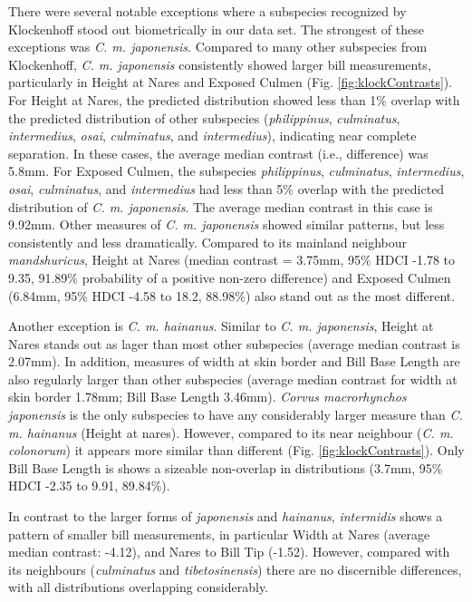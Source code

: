 \documentclass[10pt,a4paper]{article}
\begin{document}
There were several notable exceptions where a subspecies recognized by Klockenhoff stood out biometrically in our data set.
The strongest of these exceptions was \emph{C. m. japonensis}.
Compared to many other subspecies from Klockenhoff, \emph{C. m. japonensis} consistently showed larger bill measurements, particularly in Height at Nares and Exposed Culmen (Fig. \ref{fig:klockContrasts}).
For Height at Nares, the predicted distribution showed less than 1\% overlap with the predicted distribution of other subspecies (\emph{philippinus}, \emph{culminatus}, \emph{intermedius}, \emph{osai}, \emph{culminatus}, and \emph{intermedius}), indicating near complete separation.
In these cases, the average median contrast (i.e., difference) was 5.8mm.
For Exposed Culmen, the subspecies \emph{philippinus}, \emph{culminatus}, \emph{intermedius}, \emph{osai}, \emph{culminatus}, and \emph{intermedius} had less than 5\% overlap with the predicted distribution of \emph{C. m. japonensis}.
The average median contrast in this case is 9.92mm.
Other measures of \emph{C. m. japonensis} showed similar patterns, but less consistently and less dramatically.
Compared to its mainland neighbour \emph{mandshuricus}, Height at Nares (median contrast = 3.75mm, 95\% HDCI -1.78 to 9.35, 91.89\% probability of a positive non-zero difference) and Exposed Culmen (6.84mm, 95\% HDCI -4.58 to 18.2, 88.98\%) also stand out as the most different.

Another exception is \emph{C. m. hainanus}.
Similar to \emph{C. m. japonensis}, Height at Nares stands out as lager than most other subspecies (average median contrast is 2.07mm).
In addition, measures of width at skin border and Bill Base Length are also regularly larger than other subspecies (average median contrast for width at skin border 1.78mm; Bill Base Length 3.46mm).
\emph{Corvus macrorhynchos japonensis} is the only subspecies to have any considerably larger measure than \emph{C. m. hainanus} (Height at nares).
However, compared to its near neighbour (\emph{C. m. colonorum}) it appears more similar than different (Fig. \ref{fig:klockContrasts}).
Only Bill Base Length is shows a sizeable non-overlap in distributions (3.7mm, 95\% HDCI -2.35 to 9.91, 89.84\%).

In contrast to the larger forms of \emph{japonensis} and \emph{hainanus}, \emph{intermidis} shows a pattern of smaller bill measurements, in particular Width at Nares (average median contrast: -4.12), and Nares to Bill Tip (-1.52).
However, compared with its neighbours (\emph{culminatus} and \emph{tibetosinensis}) there are no discernible differences, with all distributions overlapping considerably.
\end{document}
